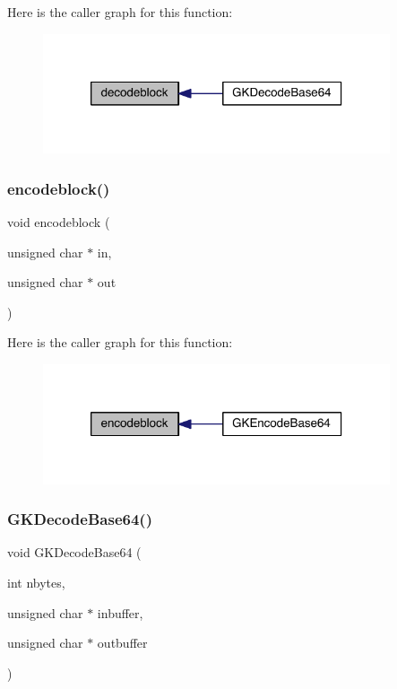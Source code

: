 Here is the caller graph for this function\+:\nopagebreak
\begin{figure}[H]
\begin{center}
\leavevmode
\includegraphics[width=290pt]{a00014_a16b79810a7cfac6a5bc729e7bea80f7b_icgraph}
\end{center}
\end{figure}
\mbox{\label{a00014_a9196de4bd8fefa1d09e0d4a273dedde5}} 
\subsubsection{\texorpdfstring{encodeblock()}{encodeblock()}}
{\footnotesize\ttfamily void encodeblock (\begin{DoxyParamCaption}\item[{unsigned char $\ast$}]{in,  }\item[{unsigned char $\ast$}]{out }\end{DoxyParamCaption})}

Here is the caller graph for this function\+:\nopagebreak
\begin{figure}[H]
\begin{center}
\leavevmode
\includegraphics[width=290pt]{a00014_a9196de4bd8fefa1d09e0d4a273dedde5_icgraph}
\end{center}
\end{figure}
\mbox{\label{a00014_a489bc1aa604dc1c8bc1fcb4e404de26a}} 
\subsubsection{\texorpdfstring{G\+K\+Decode\+Base64()}{GKDecodeBase64()}}
{\footnotesize\ttfamily void G\+K\+Decode\+Base64 (\begin{DoxyParamCaption}\item[{int}]{nbytes,  }\item[{unsigned char $\ast$}]{inbuffer,  }\item[{unsigned char $\ast$}]{outbuffer }\end{DoxyParamCaption})}

